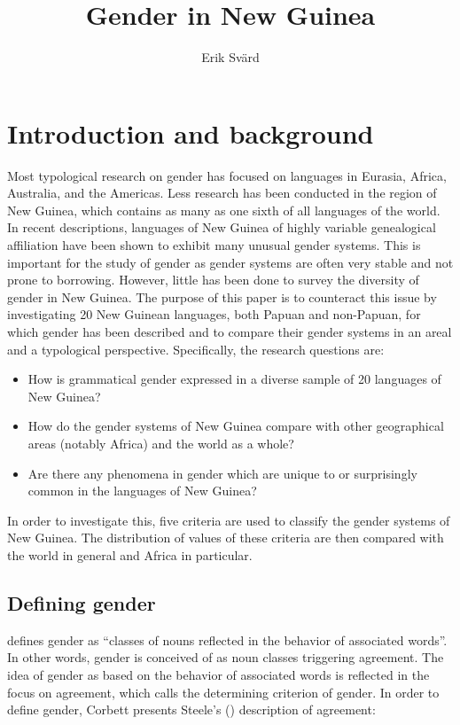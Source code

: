 \documentclass[output=collectionpaper]{langsci/langscibook}
\title{Gender in New Guinea}
\author{Erik Svärd\affiliation{earlier Stockholm University}}
\begin{document}
\section{Introduction and background}

Most typological research on gender has focused on languages in Eurasia, Africa, Australia, and the Americas. Less research has been conducted in the region of New Guinea, which contains as many as one sixth of all languages of the world. In recent descriptions, languages of New Guinea of highly variable genealogical affiliation have been shown to exhibit many unusual gender systems. This is important for the study of gender as gender systems are often very stable and not prone to borrowing. However, little has been done to survey the diversity of gender in New Guinea. The purpose of this paper is to counteract this issue by investigating 20 New Guinean languages, both Papuan and non-Papuan, for which gender has been described and to compare their gender systems in an areal and a typological perspective. Specifically, the research questions are:

\begin{itemize}
\item How is grammatical gender expressed in a diverse sample of 20 languages of New Guinea?

\item How do the gender systems of New Guinea compare with other geographical areas (notably Africa) and the world as a whole?

\item Are there any phenomena in gender which are unique to or surprisingly common in the languages of New Guinea?
\end{itemize}


In order to investigate this, five criteria are used to classify the gender systems of New Guinea. The distribution of values of these criteria are then compared with the world in general and Africa in particular.

\subsection{Defining gender}

\citet[231]{Hockett1958} defines gender as ``classes of nouns reflected in the behavior of associated words''. In other words, gender is conceived of as noun classes triggering agreement. The idea of gender as based on the behavior of associated words is reflected in the focus on agreement, which \citet[4]{Corbett1991} calls the determining criterion of gender. In order to define gender, Corbett presents Steele's (\citeyear{Steele1978}) description of agreement:
\end{document}

